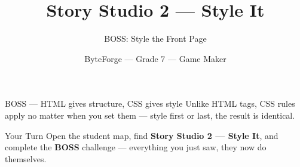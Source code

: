 \documentclass[aspectratio=169]{beamer}
\title{Story Studio 2 — Style It}
\subtitle{BOSS: Style the Front Page}
\author{ByteForge --- Grade 7 --- Game Maker}
\date{}
\begin{document}
\begin{frame}
    \titlepage
\end{frame}

\begin{frame}{BOSS — HTML gives structure, CSS gives style}
    \Large
    Unlike HTML tags, CSS rules apply no matter when you set them — style first or last, the result is identical.
\end{frame}

\begin{frame}{Your Turn}
    \Large
    Open the student map, find \textbf{Story Studio 2 — Style It}, and complete
    the \textbf{BOSS} challenge --- everything you just saw, they now do themselves.
\end{frame}
\end{document}
